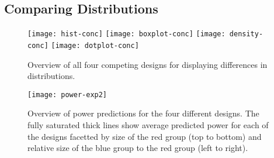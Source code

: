 \subsection{Comparing Distributions}

\begin{figure*} [hbtp]
   \centering
   \texttt{[image: hist-conc]} 
   \texttt{[image: boxplot-conc]} 
   \texttt{[image: density-conc]} 
   \texttt{[image: dotplot-conc]} 
   \caption{Overview of all four competing designs for displaying differences in distributions.}
   \label{fig:expii}
\end{figure*}

\begin{figure*}[htbp] %
   \centering
   \texttt{[image: power-exp2]} 
   \caption{Overview of power predictions for the four different designs. The fully saturated thick lines show average predicted power for each of the designs facetted by size of the red group (top to bottom) and relative size of the blue group to the red group (left to right). }
   \label{fig:power2}
\end{figure*}

